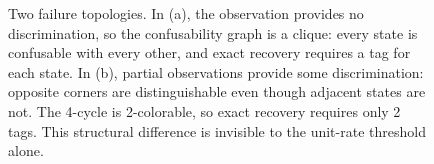 \begin{figure}[t]
\caption{Two failure topologies. In (a), the observation provides no discrimination, so the confusability graph is a clique: every state is confusable with every other, and exact recovery requires a tag for each state. In (b), partial observations provide some discrimination: opposite corners are distinguishable even though adjacent states are not. The 4-cycle is 2-colorable, so exact recovery requires only 2 tags. This structural difference is invisible to the unit-rate threshold alone.}
\label{fig:failure-topology}
\end{figure}
